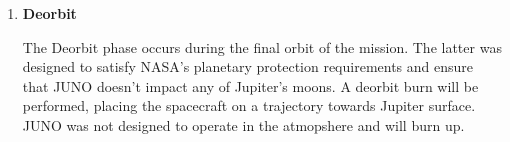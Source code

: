\begin{enumerate}
    \item \textbf{Deorbit}
    
    The Deorbit phase occurs during the final orbit of the mission. The latter was designed to satisfy NASA's planetary protection requirements and ensure that JUNO doesn't impact any of Jupiter's moons. A deorbit burn will be performed, placing the spacecraft on a trajectory towards Jupiter surface.
    JUNO was not designed to operate in the atmopshere and will burn up.
    
     
\end{enumerate}